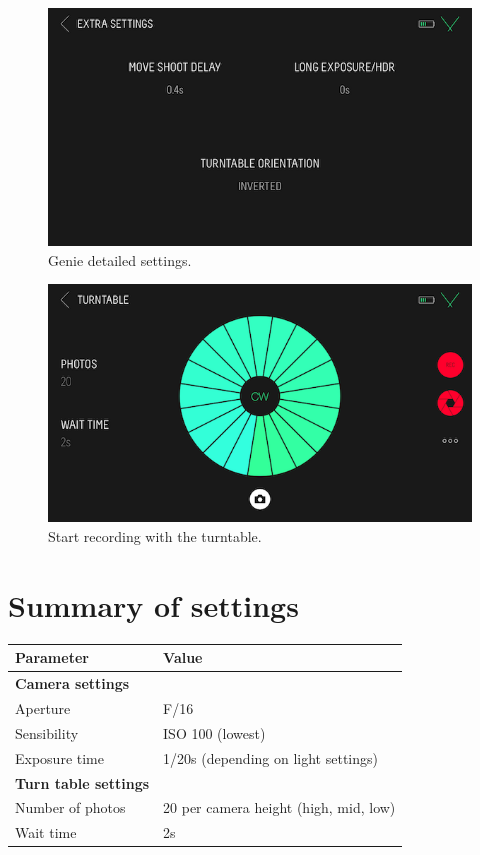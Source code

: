 \documentclass[
]{book}
\begin{document}
\begin{figure}

{\centering \includegraphics[width=0.5\linewidth]{Figures/genie_settings} 

}

\caption{Genie detailed settings.}\label{fig:genie-settings}
\end{figure}

\begin{figure}

{\centering \includegraphics[width=0.5\linewidth]{Figures/genie_turntable_20_1} 

}

\caption{Start recording with the turntable.}\label{fig:genie-record}
\end{figure}

\hypertarget{summary-of-settings}{%
\section{Summary of settings}\label{summary-of-settings}}

\begin{longtable}[]{@{}ll@{}}
\toprule\noalign{}
\textbf{Parameter} & \textbf{Value} \\
\midrule\noalign{}
\endhead
\bottomrule\noalign{}
\endlastfoot
\textbf{Camera settings} & \\
Aperture & F/16 \\
Sensibility & ISO 100 (lowest) \\
Exposure time & 1/20s (depending on light settings) \\
\textbf{Turn table settings} & \\
Number of photos & 20 per camera height (high, mid, low) \\
Wait time & 2s \\
\end{longtable}
\end{document}

